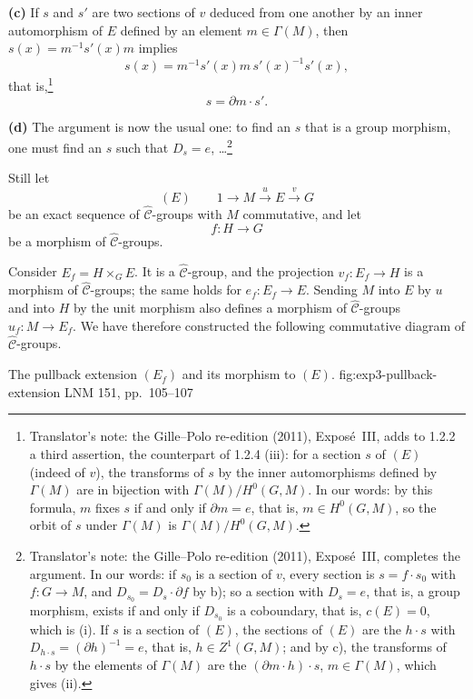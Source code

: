 \smallskip
\noindent\textbf{(c)}
If \(s\) and \(s'\) are two sections of \(v\) deduced from one
another by an inner automorphism of \(E\) defined by an element
\(m\in\Gamma(M)\), then \(s(x)=m^{-1}s'(x)m\) implies
\[
 s(x)=m^{-1}s'(x)m\,s'(x)^{-1}s'(x),
\]
that is,\footnote{Translator's note: the Gille--Polo re-edition (2011), Exposé~III, adds to 1.2.2 a third
assertion, the counterpart of 1.2.4 (iii): for a section \(s\) of \((E)\)
(indeed of \(v\)), the transforms of \(s\) by the inner automorphisms defined
by \(\Gamma(M)\) are in bijection with \(\Gamma(M)/H^0(G,M)\). In our words:
by this formula, \(m\) fixes \(s\) if and only if \(\partial m=e\), that is,
\(m\in H^0(G,M)\), so the orbit of \(s\) under \(\Gamma(M)\) is
\(\Gamma(M)/H^0(G,M)\).}
\[
 s=\partial m\cdot s'.
\]

\smallskip
\noindent\textbf{(d)}
The argument is now the usual one: to find an \(s\) that is a group
morphism, one must find an \(s\) such that \(D_s=e\),
\ldots\footnote{Translator's note: the Gille--Polo re-edition (2011), Exposé~III, completes the argument. In our words: if
\(s_0\) is a section of \(v\), every section is \(s=f\cdot s_0\) with
\(f\colon G\to M\), and \(D_{s_0}=D_s\cdot\partial f\) by b); so a section with
\(D_s=e\), that is, a group morphism, exists if and only if \(D_{s_0}\) is a
coboundary, that is, \(c(E)=0\), which is (i). If \(s\) is a section of
\((E)\), the sections of \((E)\) are the \(h\cdot s\) with
\(D_{h\cdot s}=(\partial h)^{-1}=e\), that is, \(h\in Z^1(G,M)\); and by c),
the transforms of \(h\cdot s\) by the elements of \(\Gamma(M)\) are the
\((\partial m\cdot h)\cdot s\), \(m\in\Gamma(M)\), which gives (ii).}

Still let
\[
 (E)\qquad
 1\longrightarrow M\xrightarrow{u}E\xrightarrow{v}G
\]
be an exact sequence of \(\widehat{\mathscr C}\)-groups with \(M\)
commutative, and let
\[
 f:H\longrightarrow G
\]
be a morphism of \(\widehat{\mathscr C}\)-groups.

Consider \(E_f=H\times_G E\). It is a
\(\widehat{\mathscr C}\)-group, and the projection
\(v_f:E_f\to H\) is a morphism of
\(\widehat{\mathscr C}\)-groups; the same holds for
\(e_f:E_f\to E\). Sending \(M\) into \(E\) by \(u\) and into \(H\)
by the unit morphism also defines a morphism of
\(\widehat{\mathscr C}\)-groups \(u_f:M\to E_f\). We have therefore
constructed the following commutative diagram of
\(\widehat{\mathscr C}\)-groups.

  {The pullback extension \((E_f)\) and its morphism to \((E)\).}
  {fig:exp3-pullback-extension}
  {LNM 151, pp.~105--107}

